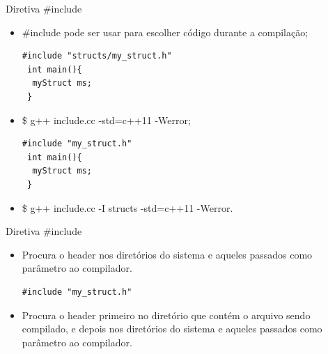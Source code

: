 \documentclass[12pt,table,xcolor={dvipsnames}]{beamer}
\begin{document}
\begin{frame}[fragile]{Diretiva \#include}
\begin{itemize}
\item \#include pode ser usar para escolher código durante a compilação;
\begin{lstlisting}
#include "structs/my_struct.h"
 int main(){
  myStruct ms;
 }
\end{lstlisting}
\item \$ g++ include.cc -std=c++11 -Werror;
\begin{lstlisting}
#include "my_struct.h"
 int main(){
  myStruct ms;
 }
\end{lstlisting}
\item \$ g++ include.cc -I structs -std=c++11 -Werror.
\end{itemize}
\end{frame}

\begin{frame}[fragile]{Diretiva \#include}
\begin{itemize}
\begin{lstlisting}
#include <list>
\end{lstlisting}
\item Procura o header nos diretórios do sistema e aqueles passados como parâmetro ao compilador.
\\
\begin{lstlisting}
#include "my_struct.h"
\end{lstlisting}
\item Procura o header primeiro no diretório que contém o arquivo sendo compilado, e depois nos diretórios do sistema e aqueles passados como parâmetro ao compilador.
\end{itemize}
\end{frame}
\end{document}
